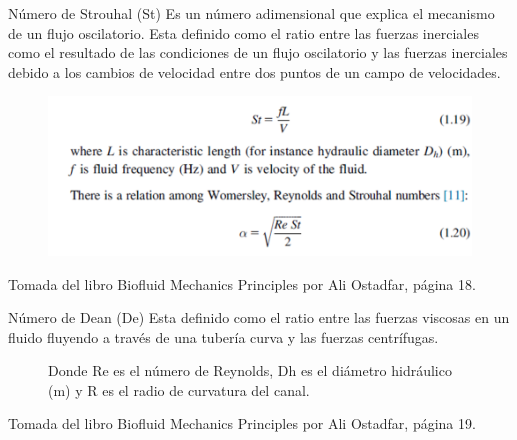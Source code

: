 \begin{frame}{Número de Strouhal (St)}
\justifying
Es un número adimensional que explica el mecanismo de un flujo oscilatorio. Esta definido como el ratio entre las fuerzas inerciales como el resultado de las condiciones de un flujo oscilatorio y las fuerzas inerciales debido a los cambios de velocidad entre dos puntos de un campo de velocidades.
\begin{figure}[H]
\centering
\includegraphics[scale=0.4]{Section_Files/picmanuel/46.png}
\label{fig: Figura2-39}
\end{figure}
{\tiny Tomada del libro Biofluid Mechanics Principles por Ali Ostadfar, página 18.}
\end{frame}

\begin{frame}{Número de Dean (De)}
\justifying
Esta definido como el ratio entre las fuerzas viscosas en un fluido fluyendo a través de una tubería curva y las fuerzas centrífugas.
\begin{figure}
\centering
{}
\caption{Donde Re es el número de Reynolds, Dh es el diámetro hidráulico (m) y R es el radio de curvatura del canal.}
\label{f:numberdean}
\end{figure}
{\tiny Tomada del libro Biofluid Mechanics Principles por Ali Ostadfar, página 19.}
\end{frame}

